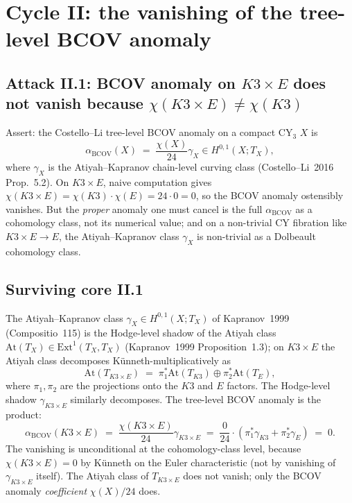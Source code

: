 \section*{Cycle II: the vanishing of the tree-level BCOV anomaly}
\label{sec:BL-4-cycle-2}

\subsection*{Attack II.1: BCOV anomaly on $K3 \times E$ does not
vanish because $\chi(K3 \times E) \neq \chi(K3)$}

Assert: the Costello--Li tree-level BCOV anomaly on a compact CY$_3$
$X$ is
\begin{equation}
\label{eq:bcov-anomaly-tree}
 \alpha_{\mathrm{BCOV}}(X)
 \;=\; \frac{\chi(X)}{24} \gamma_X \in H^{0,1}(X; T_X),
\end{equation}
where $\gamma_X$ is the Atiyah--Kapranov chain-level curving class
(Costello--Li~2016 Prop.~5.2). On $K3 \times E$, naive computation
gives $\chi(K3 \times E) = \chi(K3) \cdot \chi(E) = 24 \cdot 0 = 0$,
so the BCOV anomaly ostensibly vanishes. But the \emph{proper} anomaly
one must cancel is the full $\alpha_{\mathrm{BCOV}}$ as a cohomology
class, not its numerical value; and on a non-trivial CY fibration
like $K3 \times E \to E$, the Atiyah--Kapranov class $\gamma_X$ is
non-trivial as a Dolbeault cohomology class.

\subsection*{Surviving core II.1}

The Atiyah--Kapranov class $\gamma_X \in H^{0,1}(X; T_X)$ of
Kapranov~1999 (Compositio~115) is the Hodge-level shadow of the
Atiyah class $\mathrm{At}(T_X) \in \mathrm{Ext}^1(T_X, T_X)$
(Kapranov~1999 Proposition~1.3); on $K3 \times E$ the Atiyah class
decomposes Künneth-multiplicatively as
\begin{equation}
\label{eq:atiyah-class-decomposition}
 \mathrm{At}(T_{K3 \times E}) \;=\; \pi_1^* \mathrm{At}(T_{K3})
 \oplus \pi_2^* \mathrm{At}(T_E),
\end{equation}
where $\pi_1, \pi_2$ are the projections onto the $K3$ and $E$ factors.
The Hodge-level shadow $\gamma_{K3 \times E}$ similarly decomposes. The
tree-level BCOV anomaly is the product:
\begin{equation}
\label{eq:bcov-anomaly-k3e-factored}
 \alpha_{\mathrm{BCOV}}(K3 \times E)
 \;=\; \frac{\chi(K3 \times E)}{24} \gamma_{K3 \times E}
 \;=\; \frac{0}{24} \cdot (\pi_1^* \gamma_{K3} + \pi_2^* \gamma_E)
 \;=\; 0.
\end{equation}
The vanishing is unconditional at the cohomology-class level, because
$\chi(K3 \times E) = 0$ by Künneth on the Euler characteristic
(not by vanishing of $\gamma_{K3 \times E}$ itself). The Atiyah class
of $T_{K3 \times E}$ does not vanish; only the BCOV anomaly
\emph{coefficient} $\chi(X)/24$ does.

